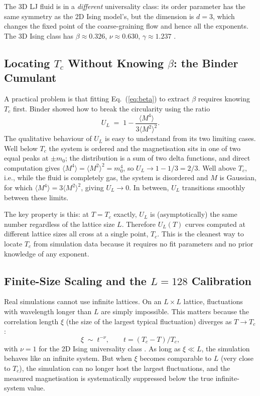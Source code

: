 \documentclass[12pt,a4paper]{article}
\begin{document}
The 3D LJ fluid is in a \emph{different} universality class: its order parameter has the
same symmetry as the 2D Ising model's, but the dimension is $d = 3$, which changes the
fixed point of the coarse-graining flow and hence all the exponents. The 3D Ising class
has $\beta \approx 0.326$, $\nu \approx 0.630$, $\gamma \approx 1.237$
\cite{pelissetto}.

\subsection{Locating $T_c$ Without Knowing $\beta$: the Binder Cumulant}

A practical problem is that fitting Eq.~(\ref{eq:beta}) to extract $\beta$ requires
knowing $T_c$ first. Binder \cite{binder} showed how to break the circularity using the
ratio
\begin{equation}
  U_L \;=\; 1 - \frac{\langle M^4 \rangle}{3 \langle M^2 \rangle^2}.
  \label{eq:binder}
\end{equation}
The qualitative behaviour of $U_L$ is easy to understand from its two limiting cases.
Well below $T_c$ the system is ordered and the magnetisation sits in one of two equal
peaks at $\pm m_0$; the distribution is a sum of two delta functions, and direct
computation gives $\langle M^4 \rangle = \langle M^2 \rangle^2 = m_0^4$, so
$U_L \to 1 - 1/3 = 2/3$. Well above $T_c$, i.e., while the fluid is completely gas, the system is disordered and $M$ is Gaussian,
for which $\langle M^4 \rangle = 3 \langle M^2 \rangle^2$, giving $U_L \to 0$. In
between, $U_L$ transitions smoothly between these limits.

The key property is this: at $T = T_c$ exactly, $U_L$ is (asymptotically) the same number
regardless of the lattice size $L$. Therefore $U_L(T)$ curves computed at different
lattice sizes all cross at a single point, $T_c$. This is the cleanest way to locate
$T_c$ from simulation data because it requires no fit parameters and no prior knowledge
of any exponent.

\subsection{Finite-Size Scaling and the $L = 128$ Calibration}
\label{sec:fss}

Real simulations cannot use infinite lattices. On an $L \times L$ lattice, fluctuations
with wavelength longer than $L$ are simply impossible. This matters because the
correlation length $\xi$ (the size of the largest typical fluctuation) diverges as
$T \to T_c$:
\begin{equation}
  \xi \;\sim\; t^{-\nu}, \qquad t = (T_c - T)/T_c,
\end{equation}
with $\nu = 1$ for the 2D Ising universality class \cite{newman}. As long as $\xi \ll
L$, the simulation behaves like an infinite system. But when $\xi$ becomes comparable
to $L$ (very close to $T_c$), the simulation can no longer host the largest fluctuations,
and the measured magnetisation is systematically suppressed below the true infinite-system
value.
\end{document}
